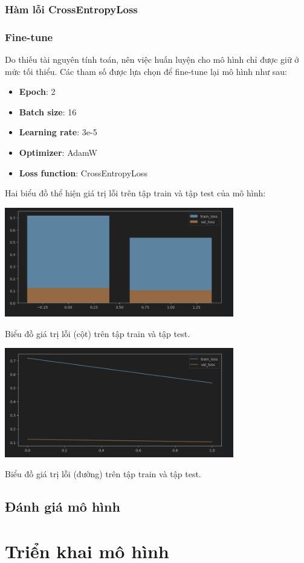 \documentclass[a4paper, 10pt]{article}
\begin{document}
\subsubsection{Hàm lỗi CrossEntropyLoss} 

\subsubsection{Fine-tune}
Do thiếu tài nguyên tính toán, nên việc huấn luyện cho mô hình chỉ được giữ ở mức tối thiểu. Các tham
số được lựa chọn để fine-tune lại mô hình như sau:

\begin{itemize}
    \item \textbf{Epoch}: 2
    \item \textbf{Batch size}: 16
    \item \textbf{Learning rate}: 3e-5
    \item \textbf{Optimizer}: AdamW
    \item \textbf{Loss function}: CrossEntropyLoss
\end{itemize}



Hai biểu đồ thể hiện giá trị lỗi trên tập train và tập test của mô hình:
\vspace{0.5cm}

\begin{minipage}{\linewidth}
    \captionsetup{type=figure}
    \centering
    \includegraphics[width=10cm]{./bar_plot.png}
    \caption{Biểu đồ giá trị lỗi (cột) trên tập train và tập test.}
\end{minipage}

\begin{minipage}{\linewidth}
    \captionsetup{type=figure}
    \centering
    \includegraphics[width=10cm]{./plot.png}
    \caption{Biểu đồ giá trị lỗi (đường) trên tập train và tập test.}
\end{minipage}

\subsection{Đánh giá mô hình}

\section{Triển khai mô hình}

\newpage
\printbibliography
\end{document}
